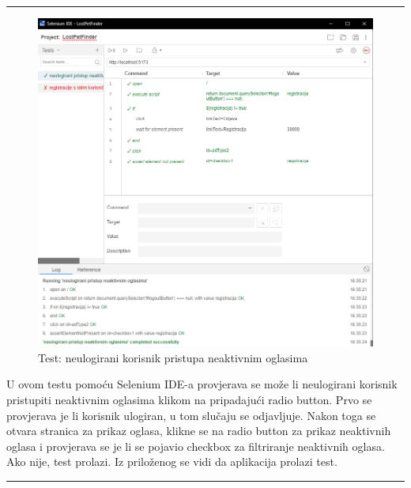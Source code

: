 \par\noindent\rule{\textwidth}{0.5pt}

\begin{figure}[!htb]
	\centering
	\includegraphics[width=\textwidth]{slike/selenium_test_1.png}
	\caption{Test: neulogirani korisnik pristupa neaktivnim oglasima}
\end{figure}

U ovom testu pomoću Selenium IDE-a provjerava se može li neulogirani korisnik pristupiti neaktivnim oglasima klikom na pripadajući radio button. Prvo se provjerava je li korisnik ulogiran, u tom slučaju se odjavljuje. Nakon toga se otvara stranica za prikaz oglasa, klikne se na radio button za prikaz neaktivnih oglasa i provjerava se je li se pojavio checkbox za filtriranje neaktivnih oglasa. Ako nije, test prolazi. Iz priloženog se vidi da aplikacija prolazi test.

\par\noindent\rule{\textwidth}{0.5pt}

